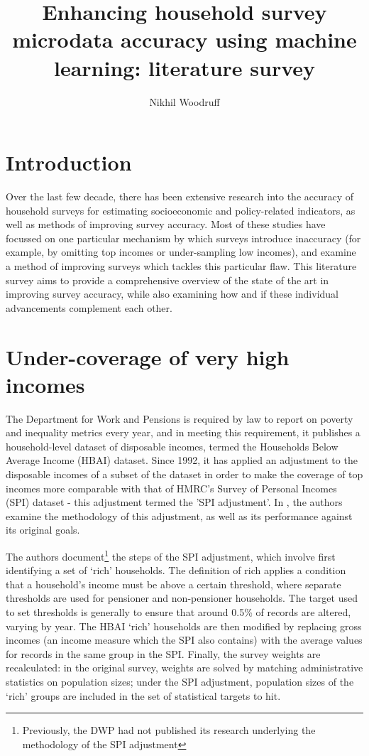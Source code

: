 \documentclass{article}
\title{Enhancing household survey microdata accuracy using machine learning: literature survey}
\date{}
\author{Nikhil Woodruff}
\begin{document}
\maketitle

\tableofcontents

\section{Introduction}

Over the last few decade, there has been extensive research into the accuracy of household surveys for estimating socioeconomic and policy-related indicators, as well as methods of improving survey accuracy. Most of these studies have focussed on one particular mechanism by which surveys introduce inaccuracy (for example, by omitting top incomes or under-sampling low incomes), and examine a method of improving surveys which tackles this particular flaw. This literature survey aims to provide a comprehensive overview of the state of the art in improving survey accuracy, while also examining how and if these individual advancements complement each other.

\section{Under-coverage of very high incomes}

The Department for Work and Pensions is required by law to report on poverty and inequality metrics every year, and in meeting this requirement, it publishes a household-level dataset of disposable incomes, termed the Households Below Average Income (HBAI) dataset.\cite{hbai} Since 1992, it has applied an adjustment to the disposable incomes of a subset of the dataset in order to make the coverage of top incomes more comparable with that of HMRC's Survey of Personal Incomes (SPI) dataset - this adjustment termed the 'SPI adjustment'. In \cite{ifs_survey_under_coverage}, the authors examine the methodology of this adjustment, as well as its performance against its original goals.

The authors document\footnote{Previously, the DWP had not published its research underlying the methodology of the SPI adjustment} the steps of the SPI adjustment, which involve first identifying a set of `rich' households. The definition of rich applies a condition that a household's income must be above a certain threshold, where separate thresholds are used for pensioner and non-pensioner households. The target used to set thresholds is generally to ensure that around 0.5\% of records are altered, varying by year. The HBAI `rich' households are then modified by replacing gross incomes (an income measure which the SPI also contains) with the average values for records in the same group in the SPI. Finally, the survey weights are recalculated: in the original survey, weights are solved by matching administrative statistics on population sizes; under the SPI adjustment, population sizes of the `rich' groups are included in the set of statistical targets to hit.
\end{document}
